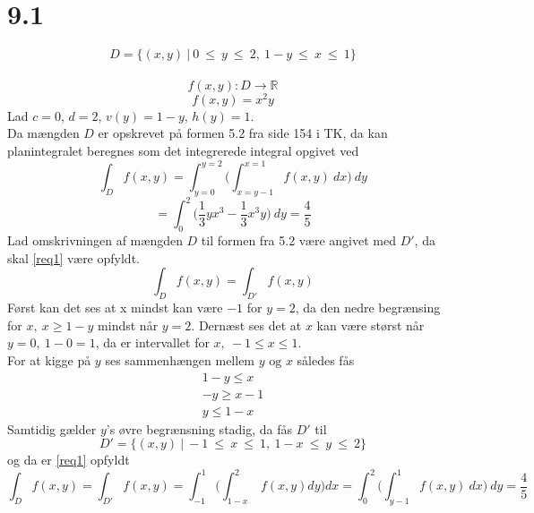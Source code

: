 \documentclass[11pt, fleqn]{article}
\begin{document}

\maketitle %
\section*{9.1}
\begin{equation}
\label{nostalgiccyborg}
D = \{(x,y)\ |\ 0\ \leq\ y\ \leq\ 2,\ 1-y\ \leq\ x\ \leq\ 1 \}
\end{equation}
\\
\[
	f(x,y) : D \to \mathbb{R}
\]
\begin{equation}
f(x,y) = x^2y
\end{equation}
Lad $c=0$, $d=2$, $v(y)=1-y$, $h(y)=1$. \\
Da mængden $D$ er opskrevet på formen 5.2 fra side 154 i TK, da kan planintegralet beregnes som det integrerede integral opgivet ved 
\[
\int_D f(x,y) = \int^{y=2}_{y=0}\Bigg(\int^{x=1}_{x=y-1} f(x,y)\ dx \Bigg)\ dy
\]
\[
= \int^{2}_0 \bigg(\frac{1}{3}yx^3-\frac{1}{3}x^3y\bigg)\ dy = \frac{4}{5}
\]
Lad omskrivningen af mængden $D$ til formen fra 5.2 være angivet med $D'$, da skal \eqref{req1} være opfyldt. 
\begin{equation}
\label{req1}
\int_D f(x,y) = \int_{D'} f(x,y)
\end{equation}
Først kan det ses at x mindst kan være $-1$ for $y=2$, da den nedre begrænsing for $x,\ x\geq 1-y$ mindst når $y=2$. Dernæst ses det at $x$ kan være størst når $y=0,\ 1-0=1$, da er intervallet for $x,\ -1\leq x\leq 1$. \\
For at kigge på $y$ ses sammenhængen mellem $y \text{ og } x$ således fås 
\begin{align*}
1-y\leq x \\
-y \geq x-1 \\
y \leq 1-x
\end{align*}
Samtidig gælder $y$'s øvre begrænsning stadig, da fås $D'$ til 
\[
D'=\{(x,y)\ |\ -1\ \leq\ x\ \leq\ 1,\ 1-x\ \leq\ y\ \leq\ 2 \}
\]
og da er \eqref{req1} opfyldt 
\[
\int_{D} f(x,y) = 
\int_{D'} f(x,y) = 
\int_{-1}^1 \Bigg(\int_{1-x}^2\ f(x,y) dy \Bigg) dx = 
\int^{2}_{0}\Bigg(\int^{1}_{y-1} f(x,y)\ dx \Bigg)\ dy =  
\frac{4}{5}
\]
\end{document}
